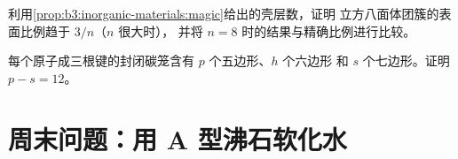 \begin{exercise}[$\star\star\star$]\label{exo:b3:inorganic-materials:11}
利用\cref{prop:b3:inorganic-materials:magic}给出的壳层数，证明
立方八面体团簇的表面比例趋于 $3/n$（$n$ 很大时），
并将 $n = 8$ 时的结果与精确比例进行比较。
\end{exercise}

\begin{exercise}[$\star\star\star$]\label{exo:b3:inorganic-materials:12}
每个原子成三根键的封闭碳笼含有 $p$ 个五边形、$h$ 个六边形
和 $s$ 个七边形。证明 $p - s = 12$。
\end{exercise}

\section{周末问题：用 A 型沸石软化水}

